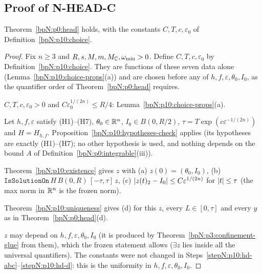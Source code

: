 \subsection{Proof of N-HEAD-C}\label{bpN:p10:s-head}

\begin{theorem}\label{bpN:p10:head}
Theorem~\ref{bpN:p0:head} holds, with the constants $C,T,c,\varepsilon_0$ of Definition~\ref{bpN:p10:choice}.
\end{theorem}
\begin{proof}
\label{stepN:p10:hd-order} Fix $n\ge3$ and $R,s,M,m,M_{\mathbb{C}},\omega_{\min}>0$. Define $C,T,c,\varepsilon_0$ by Definition~\ref{bpN:p10:choice}. They are functions of these seven data alone (Lemma~\ref{bpN:p10:choice-props}(a)) and are chosen before any of $h,f,\varepsilon,\theta_0,I_0$, as the quantifier order of Theorem~\ref{bpN:p0:head} requires.

\label{stepN:p10:hd-const} $C,T,c,\varepsilon_0>0$ and $C\varepsilon_0^{1/(2n)}\le R/4$: Lemma~\ref{bpN:p10:choice-props}(a).

\label{stepN:p10:hd-univ} Let $h,f,\varepsilon$ satisfy (H1)--(H7), $\theta_0\in\mathbb{R}^n$, $I_0\in B(0,R/2)$, $\tau=T\exp(c\varepsilon^{-1/(2n)})$ and $H=H_{h,f}$. Proposition~\ref{bpN:p10:hypotheses-check} applies (its hypotheses are exactly (H1)--(H7); no other hypothesis is used, and nothing depends on the bound $A$ of Definition~\ref{bpN:p0:integrable}(iii)).

\label{stepN:p10:hd-abc} Theorem~\ref{bpN:p10:existence} gives $z$ with (a) $z(0)=(\theta_0,I_0)$, (b) $\texttt{IsSolutionOn}\,H\,B(0,R)\,[-\tau,\tau]\,z$, (c) $\lvert z(t)_2-I_0\rvert\le C\varepsilon^{1/(2n)}$ for $\lvert t\rvert\le\tau$ (the max norm in $\mathbb{R}^n$ is the frozen norm).

\label{stepN:p10:hd-d} Theorem~\ref{bpN:p10:uniqueness} gives (d) for this $z$, every $L\in[0,\tau]$ and every $y$ as in Theorem~\ref{bpN:p0:head}(d).

\label{stepN:p10:hd-dep} $z$ may depend on $h,f,\varepsilon,\theta_0,I_0$ (it is produced by Theorem~\ref{bpN:p3:confinement-glue} from them), which the frozen statement allows ($\exists z$ lies inside all the universal quantifiers). The constants were not changed in Steps~\ref{stepN:p10:hd-abc}--\ref{stepN:p10:hd-d}: this is the uniformity in $h,f,\varepsilon,\theta_0,I_0$.
\end{proof}

